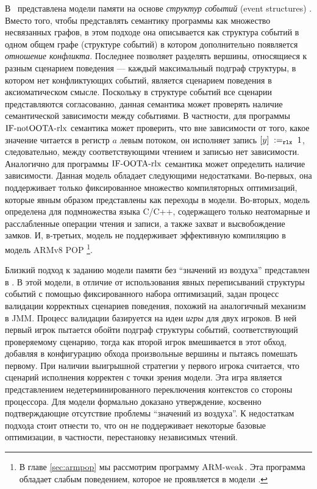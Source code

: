 В~\cite{PichonPharabod-Sewell:POPL16} представлена модели памяти на основе \emph{структур событий}
(event structures) \cite{Winskel:AC86, Winskel:LTBT88}.
Вместо того, чтобы представлять семантику программы как множество несвязанных графов,
в этом подходе она описывается как структура событий в одном общем графе (структуре событий)
в котором дополнительно появляется \emph{отношение конфликта}.
Последнее позволяет разделять вершины, относящиеся к разным сценарием поведения --- каждый максимальный подграф
структуры, в котором нет конфликтующих событий, является сценарием поведения в аксиоматическом смысле.
Поскольку в структуре событий все сценарии представляются согласованно,
данная семантика может проверять наличие семантической зависимости между событиями.
В частности, для программы ${\rm IF\text{-}notOOTA\text{-}rlx}$ семантика может проверить,
что вне зависимости от того, какое значение читается в регистр $a$ левым потоком,
он исполняет запись $[y] \;:=_{\mathtt{rlx}}\;1$,
следовательно, между соответствующими чтением и записью нет зависимости.
Аналогично для программы ${\rm IF\text{-}OOTA\text{-}rlx}$ семантика может определить наличие зависимости.
Данная модель обладает следующими недостатками.
Во-первых, она поддерживает только фиксированное множество компиляторных оптимизаций,
которые явным образом представлены как переходы в модели.
Во-вторых, модель определена для подмножества языка C/C++, содержащего только
неатомарные и расслабленные операции чтения и записи, а также захват и высвобождение замков.
И, в-третьих, модель не поддерживает эффективную компиляцию в модель
ARMv8 POP \cite{Flur-al:POPL16}\footnote{В главе \ref{sec:armpop} мы рассмотрим программу ${\rm ARM\text{-}weak}$.
Эта программа обладает слабым поведением, которое не проявляется в модели \cite{PichonPharabod-Sewell:POPL16}.}.

Близкий подход к заданию модели памяти без ``значений из воздуха'' представлен в \cite{Jeffrey-Riely:LICS16}.
В этой модели, в отличие от использования явных переписываний структуры событий с помощью фиксированного
набора оптимизаций, задан процесс валидации корректных сценариев поведения, похожий на аналогичный
механизм в JMM. Процесс валидации базируется на идеи \emph{игры} для двух игроков.
В ней первый игрок пытается обойти подграф структуры событий,
соответствующий проверяемому сценарию, тогда как второй игрок вмешивается в этот обход,
добавляя в конфигурацию обхода произвольные вершины и пытаясь помешать первому.
При наличии выигрышной стратегии у первого игрока считается, что сценарий исполнения корректен с точки зрения
модели.
Эта игра является представлением недетерминированного переключения контекстов со стороны процессора.
Для модели формально доказано утверждение, косвенно подтверждающие отсутствие проблемы ``значений из воздуха''.
К недостаткам подхода стоит отнести то, что он не поддерживает некоторые
базовые оптимизации, в частности, перестановку независимых чтений.

